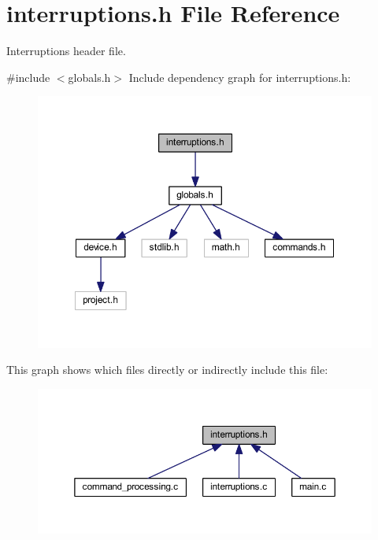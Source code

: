 \section{interruptions.\+h File Reference}
\label{interruptions_8h}


Interruptions header file.  


{\ttfamily \#include $<$globals.\+h$>$}\newline
Include dependency graph for interruptions.\+h\+:
\nopagebreak
\begin{figure}[H]
\begin{center}
\leavevmode
\includegraphics[width=350pt]{interruptions_8h__incl}
\end{center}
\end{figure}
This graph shows which files directly or indirectly include this file\+:
\nopagebreak
\begin{figure}[H]
\begin{center}
\leavevmode
\includegraphics[width=350pt]{interruptions_8h__dep__incl}
\end{center}
\end{figure}
